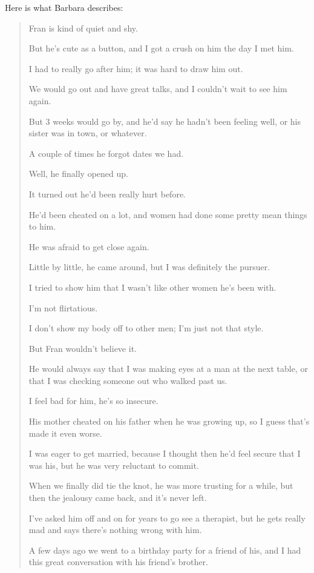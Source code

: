 \documentclass[oneside]{article}
\numberwithin{equation}{section}
\begin{document}
Here is what Barbara describes:
\begin{quotation}
    Fran is kind of quiet and shy.
    
    But he's cute as a button, and I got a crush on him the day I met him.
    
    I had to really go after him; it was hard to draw him out.
    
    We would go out and have great talks, and I couldn't wait to see him again.
    
    But 3 weeks would go by, and he'd say he hadn't been feeling well, or his sister was in town, or whatever.
    
    A couple of times he forgot dates we had.
    
    Well, he finally opened up.
    
    It turned out he'd been really hurt before.
    
    He'd been cheated on a lot, and women had done some pretty mean things to him.
    
    He was afraid to get close again.
    
    Little by little, he came around, but I was definitely the pursuer.
    
    I tried to show him that I wasn't like other women he's been with.
    
    I'm not flirtatious.
    
    I don't show my body off to other men; I'm just not that style.
    
    But Fran wouldn't believe it.
    
    He would always say that I was making eyes at a man at the next table, or that I was checking someone out who walked past us.
    
    I feel bad for him, he's so insecure.
    
    His mother cheated on his father when he was growing up, so I guess that's made it even worse.
    
    I was eager to get married, because I thought then he'd feel secure that I was his, but he was very reluctant to commit.
    
    When we finally did tie the knot, he was more trusting for a while, but then the jealousy came back, and it's never left.
    
    I've asked him off and on for years to go see a therapist, but he gets really mad and says there's nothing wrong with him.
    
    A few days ago we went to a birthday party for a friend of his, and I had this great conversation with his friend's brother.
    

\end{quotation}
\end{document}
